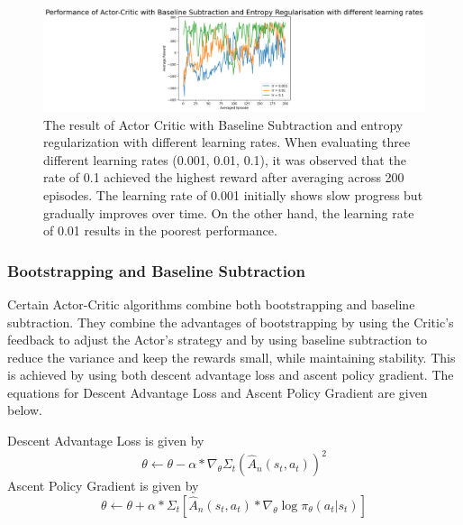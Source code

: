 \documentclass{article}
\begin{document}
\begin{figure}[h!]
\centering
\includegraphics[width=0.9\linewidth]{Report/images/actor_critic_entropy.png}
\caption{\label{fig:ActorCritic with Baseline Subtraction - Variation in Learning Rate}The result of Actor Critic with Baseline Subtraction and entropy regularization with different learning rates. 
When evaluating three different learning rates (0.001, 0.01, 0.1), it was observed that the rate of 0.1 achieved the highest reward after averaging across 200 episodes. The learning rate of 0.001 initially shows slow progress but gradually improves over time. On the other hand, the learning rate of 0.01 results in the poorest performance.}
\end{figure}
\subsubsection{Bootstrapping and Baseline Subtraction}
Certain Actor-Critic algorithms combine both bootstrapping and baseline subtraction. They combine the advantages of bootstrapping by using the Critic's feedback to adjust the Actor's strategy and by using baseline subtraction to reduce the variance and keep the rewards small, while maintaining stability. This is achieved by using both descent advantage loss and ascent policy gradient.  
The equations for Descent Advantage Loss and Ascent Policy Gradient are given below. 
\par Descent Advantage Loss is given by
\begin{equation*}
\theta \leftarrow \theta - \alpha * \nabla_\theta\Sigma_t(\hat{A}_n(s_t,a_t))^2
\end{equation*}
Ascent Policy Gradient is given by
\begin{equation*}
\theta \leftarrow \theta + \alpha * \Sigma_t[\hat{A}_n(s_t,a_t)*\nabla_\theta\log\pi_\theta(a_t|s_t)]
\end{equation*}
\end{document}
